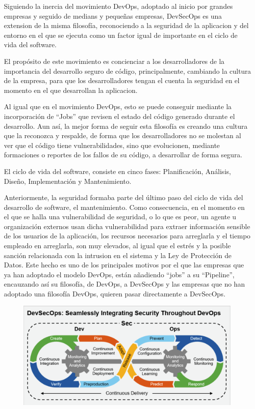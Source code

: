 \documentclass[12pt]{report} %
\begin{document}
Siguiendo la inercia del movimiento DevOps, adoptado al inicio por grandes
empresas y seguido de medians y pequeñas empresas, DevSecOps es una extension de
la misma filosofía, reconociendo a la seguridad de la aplicacion y del entorno
en el que se ejecuta como un factor igual de importante en el ciclo de vida del
software.

El propósito de este movimiento es concienciar a los desarrolladores de la
importancia del desarrollo seguro de código, principalmente, cambiando la
cultura de la empresa, para que los desarrolladores tengan el cuenta la
seguridad en el momento en el que desarrollan la aplicacion.

Al igual que en el movimiento DevOps, esto se puede conseguir mediante la
incorporación de ``Jobs'' que revisen el estado del código generado durante el
desarrollo.  Aun así, la mejor forma de seguir esta filosofía es creando una
cultura que la reconozca y respalde, de forma que los desarrolladores no se
molestan al ver que el código tiene vulnerabilidades, sino que evolucionen,
mediante formaciones o reportes de los fallos de su código, a desarrollar de
forma segura.

El ciclo de vida del software, consiste en cinco fases: Planificación, Análisis,
Diseño, Implementación y Mantenimiento.


Anteriormente, la seguridad formaba parte del último paso del ciclo de vida del
desarrollo de software, el mantenimiento.  Como consecuencia, en el momento en
el que se halla una vulnerabilidad de seguridad, o lo que es peor, un agente u
organización externos usan dicha vulnerabilidad para extraer información
sensible de los usuarios de la aplicación, los recursos necesarios para
arreglarla y el tiempo empleado en arreglarla, son muy elevados, al igual que el
estrés y la posible sanción relacionada con la intrusion en el sistema y la Ley
de Protección de Datos.  Este hecho es uno de los principales motivos por el que
las empresas que ya han adoptado el modelo DevOps, están añadiendo ``jobs'' a su
``Pipeline'', encauzando así su filosofía, de DevOps, a DevSecOps y las empresas
que no han adoptado una filosofía DevOps, quieren pasar directamente a
DevSecOps.

\begin{figure} \includegraphics[width=\textwidth]{devsecops.png} \end{figure}
\end{document}
